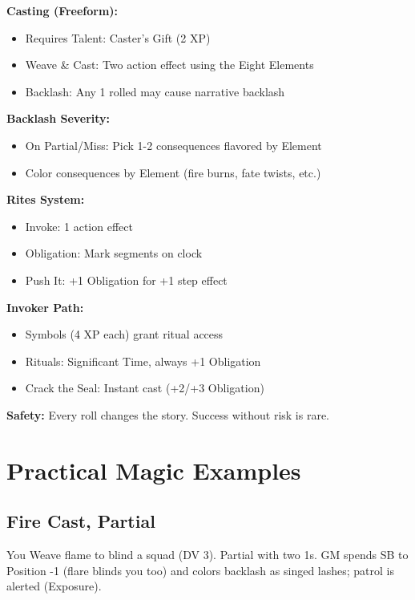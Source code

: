 \documentclass[11pt,twoside,openany]{book}
\begin{document}
\begin{tcolorbox}[colback=gray!5!white, colframe=gray!75!black, title=Magic Quick Reference, fonttitle=\bfseries]
\textbf{Casting (Freeform):}
\begin{itemize}
\item Requires Talent: Caster's Gift (2 XP)
\item Weave \& Cast: Two action effect using the Eight Elements
\item Backlash: Any 1 rolled may cause narrative backlash
\end{itemize}

\textbf{Backlash Severity:}
\begin{itemize}
\item On Partial/Miss: Pick 1-2 consequences flavored by Element
\item Color consequences by Element (fire burns, fate twists, etc.)
\end{itemize}

\textbf{Rites System:}
\begin{itemize}
\item Invoke: 1 action effect
\item Obligation: Mark segments on clock
\item Push It: +1 Obligation for +1 step effect
\end{itemize}

\textbf{Invoker Path:}
\begin{itemize}
\item Symbols (4 XP each) grant ritual access
\item Rituals: Significant Time, always +1 Obligation
\item Crack the Seal: Instant cast (+2/+3 Obligation)
\end{itemize}

\textbf{Safety:} Every roll changes the story. Success without risk is rare.
\end{tcolorbox}

\section*{Practical Magic Examples} 

\subsection*{Fire Cast, Partial}

You Weave flame to blind a squad (DV 3). Partial with two 1s. GM spends SB to Position -1 (flare blinds you too) and colors backlash as singed lashes; patrol is alerted (Exposure).
\end{document}
